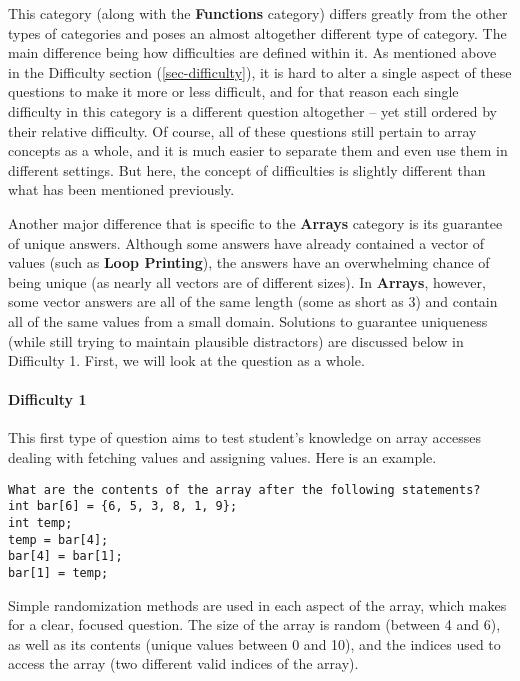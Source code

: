 \documentclass{article}
\begin{document}
This category (along with the \textbf{Functions} category) differs greatly from the other types of categories and poses an almost altogether different type of category. The main difference being how difficulties are defined within it. As mentioned above in the Difficulty section (\ref{sec-difficulty}), it is hard to alter a single aspect of these questions to make it more or less difficult, and
for that reason each single difficulty in this category is a different question altogether -- yet still ordered by their relative difficulty. Of course, all of these questions still pertain to array concepts
as a whole, and it is much easier to separate them and even use them in different settings. But here, the concept of difficulties is slightly different than what has been mentioned previously. 

Another major difference that is specific to the \textbf{Arrays} category is its guarantee of unique answers. Although some answers have already contained a vector of values (such as \textbf{Loop Printing}), 
the answers have an overwhelming chance of being unique (as nearly all vectors are of different sizes). In \textbf{Arrays}, however, some vector answers are all of the same length (some as short as 3) and contain all of the same values from a small domain. Solutions to guarantee uniqueness (while still trying to maintain plausible distractors) are discussed below in Difficulty 1. First, we will look
at the question as a whole.

\paragraph{Difficulty 1} \hfill \par

This first type of question aims to test student's knowledge on array accesses dealing with fetching values and assigning values. Here is an example.

\begin{lstlisting}
What are the contents of the array after the following statements? 
int bar[6] = {6, 5, 3, 8, 1, 9}; 
int temp; 
temp = bar[4]; 
bar[4] = bar[1]; 
bar[1] = temp; 
\end{lstlisting}


Simple randomization methods are used in each aspect of the array, which makes for a clear, focused question. The size of the array is random (between 4 and 6), as well as its contents
(unique values between 0 and 10), and the indices used to access the array (two different valid indices of the array). 
\end{document}
